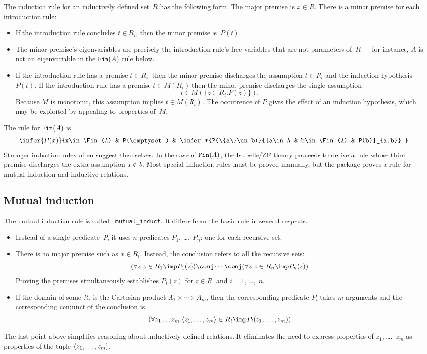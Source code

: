 The induction rule for an inductively defined set~$R$ has the following form.
The major premise is $x\in R$.  There is a minor premise for each
introduction rule:
\begin{itemize}
\item If the introduction rule concludes $t\in R_i$, then the minor premise
is~$P(t)$.

\item The minor premise's eigenvariables are precisely the introduction
rule's free variables that are not parameters of~$R$ --- for instance, $A$
is not an eigenvariable in the ${\tt Fin}(A)$ rule below.

\item If the introduction rule has a premise $t\in R_i$, then the minor
premise discharges the assumption $t\in R_i$ and the induction
hypothesis~$P(t)$.  If the introduction rule has a premise $t\in M(R_i)$
then the minor premise discharges the single assumption
\[ t\in M(\{z\in R_i. P(z)\}). \] 
Because $M$ is monotonic, this assumption implies $t\in M(R_i)$.  The
occurrence of $P$ gives the effect of an induction hypothesis, which may be
exploited by appealing to properties of~$M$.
\end{itemize}
The rule for ${\tt Fin}(A)$ is
\[ \infer{P(x)}{x\in\Fin(A) & P(\emptyset)
        & \infer*{P(\{a\}\un b)}{[a\in A & b\in\Fin(A) & P(b)]_{a,b}} }
\] 
Stronger induction rules often suggest themselves.  In the case of
${\tt Fin}(A)$, the Isabelle/ZF theory proceeds to derive a rule whose third
premise discharges the extra assumption $a\not\in b$.  Most special induction
rules must be proved manually, but the package proves a rule for mutual
induction and inductive relations.

\subsection{Mutual induction}
The mutual induction rule is called {\tt
mutual\_induct}.  It differs from the basic rule in several respects:
\begin{itemize}
\item Instead of a single predicate~$P$, it uses $n$ predicates $P_1$,
\ldots,~$P_n$: one for each recursive set.

\item There is no major premise such as $x\in R_i$.  Instead, the conclusion
refers to all the recursive sets:
\[ (\forall z.z\in R_1\imp P_1(z))\conj\cdots\conj
   (\forall z.z\in R_n\imp P_n(z))
\]
Proving the premises simultaneously establishes $P_i(z)$ for $z\in
R_i$ and $i=1$, \ldots,~$n$.

\item If the domain of some $R_i$ is the Cartesian product
$A_1\times\cdots\times A_m$, then the corresponding predicate $P_i$ takes $m$
arguments and the corresponding conjunct of the conclusion is
\[ (\forall z_1\ldots z_m.\pair{z_1,\ldots,z_m}\in R_i\imp P_i(z_1,\ldots,z_m))
\]
\end{itemize}
The last point above simplifies reasoning about inductively defined
relations.  It eliminates the need to express properties of $z_1$,
\ldots,~$z_m$ as properties of the tuple $\langle z_1,\ldots,z_m\rangle$.


